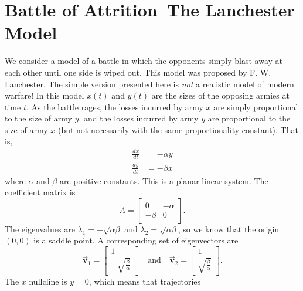 \documentclass[reqno]{immbook}
\newcommand{\BV}{\vec{\textbf{v}}}
\numberwithin{equation}{chapter}
\numberwithin{question}{section}
\numberwithin{theorem}{chapter}
\numberwithin{figure}{chapter}
\theoremstyle{definition}
\newtheorem{exercise}{}[section]
\newenvironment{exercises}%
{%
\medskip\hrule\medskip\noindent\textbf{Exercises}%
}%
{%
\medskip\hrule
}
\begin{document}
%
\newpage
%
\section{Battle of Attrition--The Lanchester Model}
%
We consider a model of a battle in which the opponents
simply blast away at each other until one side is wiped
out.
This model was proposed by F. W. Lanchester\cite{Lanchester}.
The simple version presented here
is \emph{not} a realistic model of modern warfare!
In this model $x(t)$ and $y(t)$ are the sizes of the
opposing armies at time $t$.
As the battle rages, the losses incurred by army $x$
are simply proportional to the size of army $y$,
and the losses incurred by army $y$ are proportional
to the size of army $x$ (but not necessarily with
the same proportionality constant).
That is,
\begin{equation}
\begin{split}
   \frac{dx}{dt} & = - \alpha y \\
   \frac{dy}{dt} & = - \beta x
\end{split}
\end{equation}
where $\alpha$ and $\beta$ are positive constants.
This is a planar linear system.
The coefficient matrix is
\begin{equation}
  A = \begin{bmatrix} 0 & -\alpha \\ -\beta & 0 \end{bmatrix}.
\end{equation}
The eigenvalues are $\lambda_1 = -\sqrt{\alpha\beta}$
and $\lambda_2 = \sqrt{\alpha\beta}$,
so we know that the origin $(0,0)$ is a saddle point.
A corresponding set of eigenvectors are
\[
  \BV_1 = \begin{bmatrix} 1 \\ -\sqrt{\frac{\beta}{\alpha}}\end{bmatrix}
  \quad \textrm{and}\quad
  \BV_2 = \begin{bmatrix} 1 \\ \sqrt{\frac{\beta}{\alpha}}\end{bmatrix}.
\]
The $x$ nullcline is $y=0$, which means that trajectories
\end{document}
